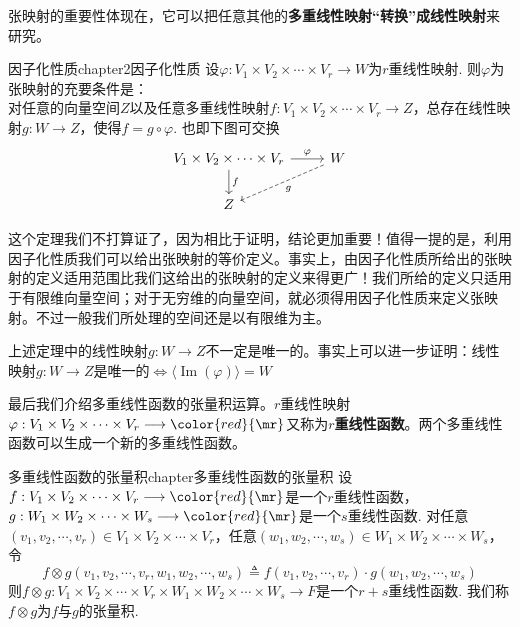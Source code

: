 张映射的重要性体现在，它可以把任意其他的\textbf{多重线性映射“转换”成线性映射}来研究。
\begin{mythm}{因子化性质}{chapter2因子化性质}
	设$\varphi:V_{1}\times V_{2}\times\cdots\times V_{r}\longrightarrow W$为$r$重线性映射. 则$\varphi$为张映射的充要条件是：\\
	对任意的向量空间$Z$以及任意多重线性映射$f:V_{1}\times V_{2}\times\cdots\times V_{r}\longrightarrow Z$，总存在线性映射$g:W\longrightarrow Z$，使得$f=g\circ\varphi$. 也即下图可交换
	\[
	\begin{tikzcd}
	V_{1}\times V_{2}\times\cdots\times V_{r} \arrow[r, "\varphi"] \arrow[d, "f", left ] & W \arrow[dl,dashrightarrow, "g"]\\
	Z  &
	\end{tikzcd} 
	\]
\end{mythm}

这个定理我们不打算证了，因为相比于证明，结论更加重要！值得一提的是，利用因子化性质我们可以给出张映射的等价定义。事实上，由因子化性质所给出的张映射的定义适用范围比我们这给出的张映射的定义来得更广！我们所给的定义只适用于有限维向量空间；对于无穷维的向量空间，就必须得用因子化性质来定义张映射。不过一般我们所处理的空间还是以有限维为主。

\begin{remark}
	上述定理中的线性映射$g:W\longrightarrow Z$不一定是唯一的。事实上可以进一步证明：线性映射$g:W\longrightarrow Z$是唯一的$\Leftrightarrow \langle\operatorname{Im}(\varphi) \rangle=W$
\end{remark}

最后我们介绍多重线性函数的张量积运算。$r$重线性映射$\varphi:V_{1}\times V_{2}\times\cdots\times V_{r}\longrightarrow {\color{red}{\mr}}$又称为\textbf{$r$重线性函数}。两个多重线性函数可以生成一个新的多重线性函数。
\begin{mydef}{多重线性函数的张量积}{chapter多重线性函数的张量积}
	设$f:V_{1}\times V_{2}\times\cdots\times V_{r}\longrightarrow {\color{red}{\mr}}$是一个$r$重线性函数，$g:W_{1}\times W_{2}\times\cdots\times W_{s}\longrightarrow {\color{red}{\mr}}$是一个$s$重线性函数. 对任意$(v_{1},v_{2},\cdots,v_{r})\in V_{1}\times V_{2}\times\cdots\times V_{r}$，任意$(w_{1},w_{2},\cdots,w_{s})\in W_{1}\times W_{2}\times\cdots\times W_{s}$，令
	\[
	f\otimes g(v_{1},v_{2},\cdots,v_{r},w_{1},w_{2},\cdots,w_{s})\triangleq f(v_{1},v_{2},\cdots,v_{r})\cdot g(w_{1},w_{2},\cdots,w_{s})
	\]
	则$f\otimes g:V_{1}\times V_{2}\times\cdots\times V_{r}\times W_{1}\times W_{2}\times\cdots\times W_{s}\longrightarrow F$是一个$r+s$重线性函数. 我们称$f\otimes g$为$f$与$g$的张量积.
\end{mydef}

